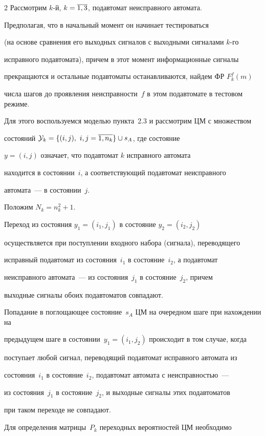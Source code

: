 \begin{multicols}{2}
Рассмотрим $k$-й, $k=\overline{1,3}$, подавтомат неисправного автомата.


Предполагая, что в начальный момент он начинает тестироваться


(на основе сравнения его выходных сигналов с выходными сигналами $k$-го


исправного подавтомата), причем в этот момент информационные сигналы


прекращаются и остальные подавтоматы останавливаются, найдем ФР $F^f_k(m)$


числа шагов до проявления неисправности~$f$ в этом подавтомате в тестовом режиме.


Для этого воспользуемся моделью пункта~2.3 и рассмотрим ЦМ с множеством


состояний ${\cal Y}_k =\{(i,j),\ i,j=\o{1,n_k}\}\cup s_A$, где состояние


$y=(i,j)$ означает, что подавтомат $k$ исправного автомата


находится в со\-сто\-янии~$i$, а со\-от\-вет\-ст\-ву\-ющий подавтомат неисправного


автомата~--- в со\-сто\-янии~$j$.


Положим $N_k=n_k^2+1$.


Переход из со\-сто\-яния $y_1=(i_1,j_1)$ в со\-сто\-яние $y_2=(i_2,j_2)$


осуществляется при поступлении входного набора (сигнала), переводящего


исправный подавтомат из со\-сто\-яния~$i_1$ в со\-сто\-яние~$i_2$, а подавтомат


неисправного автомата~--- из со\-сто\-яния~$j_1$ в со\-сто\-яние~$j_2$, причем


выходные сигналы обоих подавтоматов совпадают.


Попадание в поглощающее состояние~$s_A$ ЦМ на очередном шаге при нахождении на


предыду\-щем шаге в со\-сто\-янии~$y_1=(i_1,j_2)$ происходит в том случае, когда


поступает любой сигнал, переводящий подавтомат исправного автомата из


со\-сто\-яния~$i_1$ в со\-сто\-яние~$i_2$, подавтомат автомата с неисправностью~---


из со\-сто\-яния~$j_1$ в со\-сто\-яние~$j_2$, и выходные сигналы этих подавтоматов


при таком переходе не совпадают.





 Для определения мат\-ри\-цы~$P_k$ переходных вероятностей ЦМ необходимо



\end{multicols}
